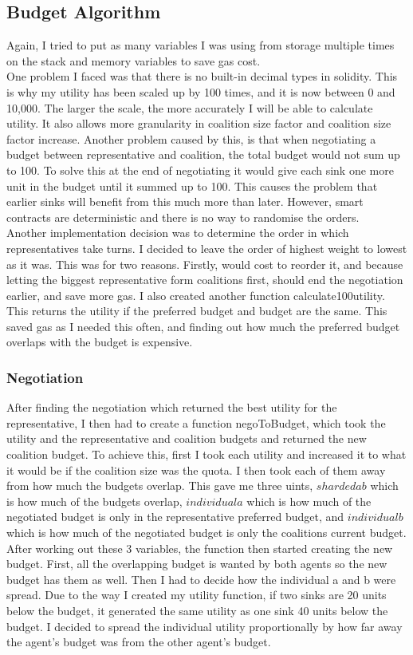 \subsection{Budget Algorithm}
Again, I tried to put as many variables I was using from storage multiple times on the stack and memory variables to save gas cost. \\
One problem I faced was that there is no built-in decimal types in solidity. This is why my utility has been scaled up by 100 times, and it is now between 0 and 10,000. The larger the scale, the more accurately I will be able to calculate utility. It also allows more granularity in coalition size factor and coalition size factor increase. Another problem caused by this, is that when negotiating a budget between representative and coalition, the total budget would not sum up to 100. To  solve this at the end of negotiating it would give each sink one more unit in the budget until it summed up to 100. This causes the problem that earlier sinks will benefit from this much more than later. However, smart contracts are deterministic and there is no way to randomise the orders. \\
Another implementation decision was to determine the order in which representatives take turns. I decided to leave the order of highest weight to lowest as it was. This was for two reasons. Firstly, would cost to reorder it, and because letting the biggest representative form coalitions first, should end the negotiation earlier, and save more gas.
I also created another function calculate100utility. This returns the utility if the preferred budget and budget are the same. This saved gas as I needed this often, and finding out how much the preferred budget overlaps with the budget is expensive. \\
\subsubsection{Negotiation}
After finding the negotiation which returned the best utility for the representative, I then had to create a function negoToBudget, which took the utility and the representative and coalition budgets and returned the new coalition budget. To achieve this, first I took each utility and increased it to what it would be if the coalition size was the quota. I then took each of them away from how much the budgets overlap. This gave me three uints,  $shardedab$ which is how much of the budgets overlap, $individuala$ which is how much of the negotiated budget is only in the representative preferred budget, and $individualb$ which is how much of the negotiated budget is only the coalitions current budget. \\
After working out these 3 variables, the function then started creating the new budget. First, all the overlapping budget is wanted by both agents so the new budget has them as well. Then I had to decide how the individual a and b were spread. Due to the way I created my utility function, if two sinks are 20 units below the budget, it generated the same utility as one sink 40 units below the budget. I decided to spread the individual utility proportionally by how far away the agent’s budget was from the other agent's budget. 
